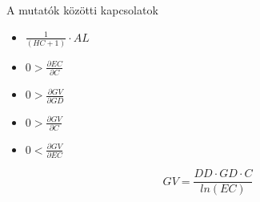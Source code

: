   \begin{frame}[<+->]{A mutatók közötti kapcsolatok}
    \begin{itemize}
      \item $\frac{1}{(HC+1)} \cdot AL$
      \item $0 > \frac{\partial EC}{\partial C}$
      \item $0 > \frac{\partial GV}{\partial GD}$
      \item $0 > \frac{\partial GV}{\partial C}$
      \item $0 < \frac{\partial GV}{\partial EC}$
    \end{itemize}

    $$GV = \frac{DD \cdot GD \cdot C}{ln(EC)}$$
  \end{frame}

